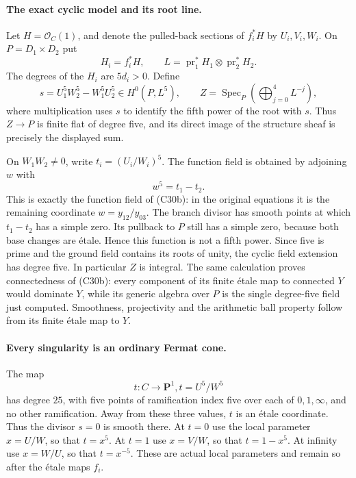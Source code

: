 \paragraph{The exact cyclic model and its root line.}
Let $H=\mathcal O_C(1)$, and denote the pulled-back
sections of $f_i^*H$ by $U_i,V_i,W_i$.  On
$P=D_1\times D_2$ put
\[
 H_i=f_i^*H,\qquad
 L=\operatorname{pr}_1^*H_1\otimes
                  \operatorname{pr}_2^*H_2.
\]
The degrees of the $H_i$ are $5d_i>0$.  Define
\[
 s=U_1^5W_2^5-W_1^5U_2^5\in H^0(P,L^5),
 \qquad
 Z=\operatorname{Spec}_P
       \left(\bigoplus_{j=0}^4L^{-j}\right),
                                                        \tag{C30f}
\]
where multiplication uses $s$ to identify the fifth
power of the root with $s$.  Thus $Z\to P$ is finite
flat of degree five, and its direct image of the
structure sheaf is precisely the displayed sum.

On $W_1W_2\ne0$, write $t_i=(U_i/W_i)^5$.
The function field is obtained by adjoining $w$ with
\[
                         w^5=t_1-t_2.
                                                        \tag{C30g}
\]
This is exactly the function field of (C30b): in the
original equations it is the remaining coordinate
$w=y_{12}/y_{03}$.  The branch divisor has smooth
points at which $t_1-t_2$ has a simple zero.  Its
pullback to $P$ still has a simple zero, because both
base changes are \'etale.  Hence this function is not
a fifth power.  Since five is prime and the ground
field contains its roots of unity, the cyclic field
extension has degree five.  In particular $Z$ is
integral.  The same calculation proves connectedness
of (C30b): every component of its finite \'etale map
to connected $Y$ would dominate $Y$, while its generic
algebra over $P$ is the single degree-five field just
computed.  Smoothness, projectivity and the arithmetic
ball property follow from its finite \'etale map to $Y$.

\paragraph{Every singularity is an ordinary Fermat cone.}
The map
\[
          t:C\longrightarrow\mathbf P^1,
                    t=U^5/W^5
\]
has degree $25$, with five points of ramification
index five over each of $0,1,\infty$, and no other
ramification.  Away from these three values, $t$ is
an \'etale coordinate.  Thus the divisor $s=0$ is
smooth there.  At $t=0$ use the local parameter
$x=U/W$, so that $t=x^5$.  At $t=1$ use
$x=V/W$, so that $t=1-x^5$.  At infinity use
$x=W/U$, so that $t=x^{-5}$.  These are actual local
parameters and remain so after the \'etale maps $f_i$.

